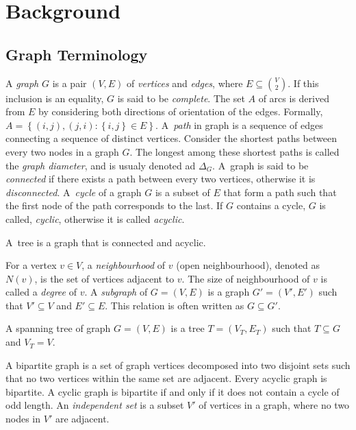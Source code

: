 \chapter{Background}\label{sec:back}

\section{Graph Terminology}\label{sec:back:graph}

A \emph{graph} $G$ is a pair $(V,E)$ of \emph{vertices} and \emph{edges}, where $E\subseteq {{V}\choose{2}}$.
If this inclusion is an equality, $G$ is said to be \emph{complete}.
 The set $A$ of arcs is derived from $E$ by considering both directions of orientation of the edges.
 Formally, $A=\left\{(i,j),(j,i):\left\{i,j\right\}\in E\right\}$.
A~\emph{path} in graph is a sequence of edges connecting a sequence of distinct vertices.
Consider the shortest paths between every two nodes in a graph $G$.
The longest among these shortest paths is called the \emph{graph diameter}, and is usualy denoted ad $\Delta_G$.
A~graph is said to be \emph{connected} if there exists a path between every two vertices, otherwise it is \emph{disconnected}.
A~\emph{cycle} of a graph $G$ is a subset of $E$ that form a path such that the first node of the path corresponds to the last. 
If $G$ contains a cycle, $G$ is called, \emph{cyclic}, otherwise it is called \emph{acyclic}.
\begin{definition}
A~tree is a graph that is connected and acyclic.
\end{definition}
For a vertex $v\in V$, a \emph{neighbourhood} of $v$ (open neighbourhood), denoted as $N(v)$, is the set of vertices adjacent to $v$.
The size of neighbourhood of $v$ is called a \emph{degree} of $v$.
A \emph{subgraph} of $G=(V,E)$ is a graph $G'=(V',E')$ such that $V'\subseteq V$ and $E'\subseteq E$.
This relation is often written as $G\subseteq G'$.
\begin{definition}
A spanning tree of graph $G=(V,E)$ is a tree $T=(V_T,E_T)$ such that $T\subseteq G$ and $V_T=V$.
\end{definition}
A bipartite graph is a set of graph vertices decomposed into two disjoint sets such that no two vertices within the same set are adjacent.
Every acyclic graph is bipartite.
A cyclic graph is bipartite if and only if it does not contain a cycle of odd length.
An \emph{independent set} is a subset $V'$ of vertices in a graph, where no two nodes in $V'$ are adjacent.

